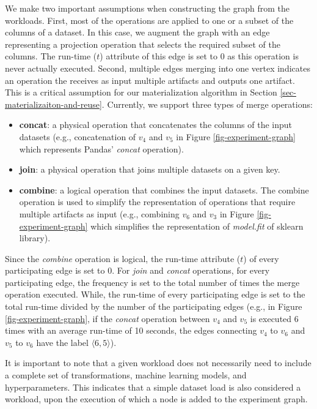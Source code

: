 We make two important assumptions when constructing the graph from the workloads.
First, most of the operations are applied to one or a subset of the columns of a dataset.
In this case, we augment the graph with an edge representing a projection operation that selects the required subset of the columns.
The run-time ($t$) attribute of this edge is set to 0 as this operation is never actually executed.
Second, multiple edges merging into one vertex indicates an operation the receives as input multiple artifacts and outputs one artifact.
This is a critical assumption for our materialization algorithm in Section \ref{sec-materializaiton-and-reuse}.
Currently, we support three types of merge operations:
\begin{itemize}
\item \textbf{concat}: a physical operation that concatenates the columns of the input datasets (e.g., concatenation of $v_4$ and $v_5$ in Figure \ref{fig-experiment-graph} which represents Pandas' \textit{concat} operation).
\item \textbf{join}: a physical operation that joins multiple datasets on a given key.
\item \textbf{combine}: a logical operation that combines the input datasets. The combine operation is used to simplify the representation of operations that require multiple artifacts as input (e.g., combining $v_6$ and $v_3$ in Figure \ref{fig-experiment-graph} which simplifies the representation of \textit{model.fit} of sklearn library).
\end{itemize}
Since the \textit{combine} operation is logical, the run-time attribute ($t$) of every participating edge is set to $0$.
For \textit{join} and \textit{concat} operations, for every participating edge, the frequency is set to the total number of times the merge operation executed.
While, the run-time of every participating edge is set to the total run-time divided by the number of the participating edges (e.g., in Figure \ref{fig-experiment-graph}, if the \textit{concat} operation between $v_4$ and $v_5$ is executed 6 times with an average run-time of 10 seconds, the edges connecting $v_4$ to $v_6$ and $v_5$ to $v_6$ have the label $\langle6, 5\rangle$).

It is important to note that a given workload does not necessarily need to include a complete set of transformations, machine learning models, and hyperparameters.
This indicates that a simple dataset load is also considered a workload, upon the execution of which a node is added to the experiment graph.